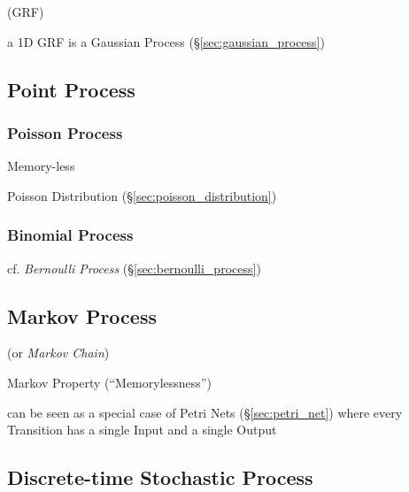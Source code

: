 (GRF)

a 1D GRF is a Gaussian Process (\S\ref{sec:gaussian_process})



\subsection{Point Process}\label{sec:point_process}

\subsubsection{Poisson Process}\label{sec:poisson_process}

Memory-less

Poisson Distribution (\S\ref{sec:poisson_distribution})



\subsubsection{Binomial Process}\label{sec:binomial_process}

cf. \emph{Bernoulli Process} (\S\ref{sec:bernoulli_process})



\subsection{Markov Process}\label{sec:markov_process}

(or \emph{Markov Chain})

Markov Property (``Memorylessness'')

can be seen as a special case of Petri Nets (\S\ref{sec:petri_net})
where every Transition has a single Input and a single Output



\subsection{Discrete-time Stochastic Process}\label{sec:discretetime_stochastic}

